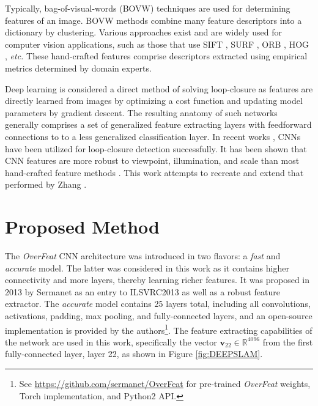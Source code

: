 \documentclass[10pt,twocolumn,letterpaper]{article}
\begin{document}
Typically, bag-of-visual-words (BOVW) techniques are used for determining features of an image. BOVW methods combine many feature descriptors into a dictionary by clustering. Various approaches exist and 
are widely used for computer vision applications, such as those that use SIFT \cite{lowe_object_1999}, SURF \cite{bay_surf:_2006}, ORB \cite{rublee_orb:_2011}, HOG \cite{dalal_histograms_2005}, 
\textit{etc.} These hand-crafted features comprise descriptors extracted using empirical metrics determined by domain experts.

Deep learning is considered a direct method of solving loop-closure as features are directly learned from images by optimizing a cost function and updating model parameters by gradient descent. The 
resulting anatomy of such networks generally comprises a set of generalized feature extracting layers with feedforward connections to to a less generalized classification layer. In recent works 
\cite{zhang_loop_2017,gupta_cognitive_2017,gao_unsupervised_2017,hou_convolutional_2015}, CNNs have been utilized for loop-closure detection successfully. It has been shown that CNN features are more 
robust to viewpoint, illumination, and scale than most hand-crafted feature methods \cite{zhang_loop_2017}. This work attempts to recreate and extend that performed by Zhang \etal \cite{zhang_loop_2017}.

\section{Proposed Method}
\label{sec:method}

The \textit{OverFeat} CNN architecture \cite{sermanet_overfeat:_2013} was introduced in two flavors: a \textit{fast} and \textit{accurate} model. The latter was considered in this work as it contains 
higher connectivity and more layers, thereby learning richer features. It was proposed in 2013 by Sermanet \etal as an entry to ILSVRC2013 as well as a robust feature extractor. The \textit{accurate} 
model contains 25 layers total, including all convolutions, activations, padding, max pooling, and fully-connected layers, and an open-source implementation is provided by the authors\footnote{See 
\href{https://github.com/sermanet/OverFeat}{https://github.com/sermanet/OverFeat} for pre-trained \textit{OverFeat} weights, Torch implementation, and Python2 API.}. The feature extracting capabilities 
of the network are used in this work, specifically the vector $\mathbf{v}_{22}\in \mathbb{R}^{4096}$ from the first fully-connected layer, layer 22, as shown in Figure \ref{fig:DEEPSLAM}.
\end{document}
